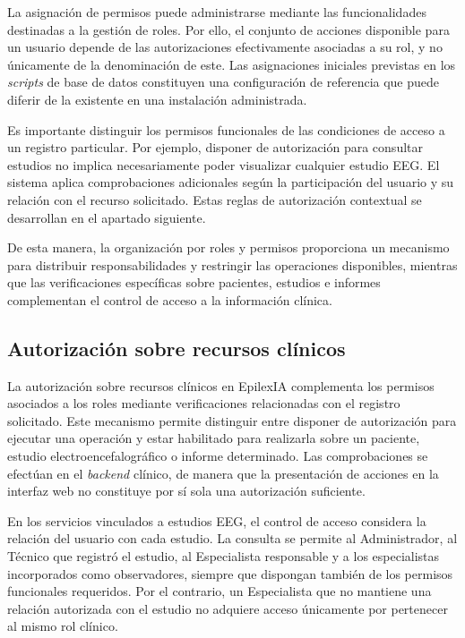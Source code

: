 La asignación de permisos puede administrarse mediante las funcionalidades destinadas a la gestión de roles. Por ello, el conjunto de acciones disponible para un usuario depende de las autorizaciones efectivamente asociadas a su rol, y no únicamente de la denominación de este. Las asignaciones iniciales previstas en los \textit{scripts} de base de datos constituyen una configuración de referencia que puede diferir de la existente en una instalación administrada.

Es importante distinguir los permisos funcionales de las condiciones de acceso a un registro particular. Por ejemplo, disponer de autorización para consultar estudios no implica necesariamente poder visualizar cualquier estudio EEG. El sistema aplica comprobaciones adicionales según la participación del usuario y su relación con el recurso solicitado. Estas reglas de autorización contextual se desarrollan en el apartado siguiente.

De esta manera, la organización por roles y permisos proporciona un mecanismo para distribuir responsabilidades y restringir las operaciones disponibles, mientras que las verificaciones específicas sobre pacientes, estudios e informes complementan el control de acceso a la información clínica.


\subsection{Autorización sobre recursos clínicos}
\label{subsec:autorizacion-recursos-clinicos}

La autorización sobre recursos clínicos en EpilexIA complementa los permisos asociados a los roles mediante verificaciones relacionadas con el registro solicitado. Este mecanismo permite distinguir entre disponer de autorización para ejecutar una operación y estar habilitado para realizarla sobre un paciente, estudio electroencefalográfico o informe determinado. Las comprobaciones se efectúan en el \textit{backend} clínico, de manera que la presentación de acciones en la interfaz web no constituye por sí sola una autorización suficiente.

En los servicios vinculados a estudios EEG, el control de acceso considera la relación del usuario con cada estudio. La consulta se permite al Administrador, al Técnico que registró el estudio, al Especialista responsable y a los especialistas incorporados como observadores, siempre que dispongan también de los permisos funcionales requeridos. Por el contrario, un Especialista que no mantiene una relación autorizada con el estudio no adquiere acceso únicamente por pertenecer al mismo rol clínico.

